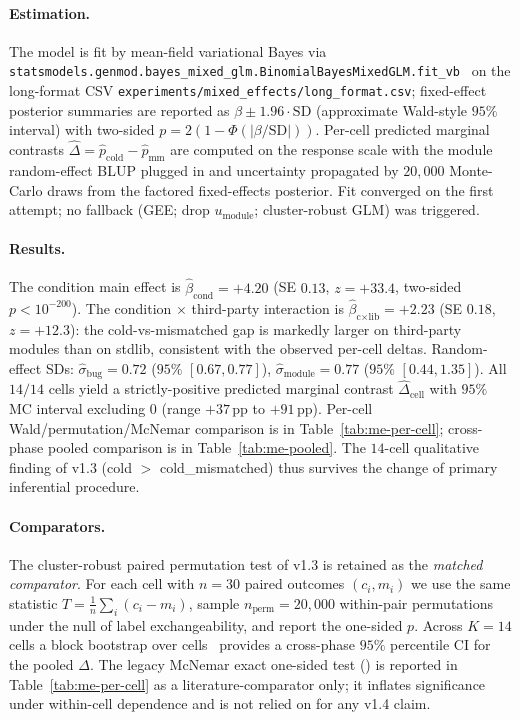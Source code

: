 \paragraph{Estimation.} The model is fit by mean-field variational Bayes via \texttt{statsmodels.\allowbreak genmod.\allowbreak bayes\_mixed\_glm.\allowbreak BinomialBayesMixedGLM.fit\_vb}~\cite{seabold2010statsmodels} on the long-format CSV \texttt{experiments/mixed\_effects/long\_format.csv}; fixed-effect posterior summaries are reported as $\beta \pm 1.96 \cdot \mathrm{SD}$ (approximate Wald-style $95\%$ interval) with two-sided $p = 2(1 - \Phi(|\beta/\mathrm{SD}|))$. Per-cell predicted marginal contrasts $\widehat{\Delta} = \widehat{p}_{\text{cold}} - \widehat{p}_{\text{mm}}$ are computed on the response scale with the module random-effect BLUP plugged in and uncertainty propagated by $20{,}000$ Monte-Carlo draws from the factored fixed-effects posterior. Fit converged on the first attempt; no fallback (GEE; drop $u_{\text{module}}$; cluster-robust GLM) was triggered.

\paragraph{Results.}
The condition main effect is $\widehat{\beta}_{\text{cond}} = +4.20$ (SE $0.13$, $z=+33.4$, two-sided $p < 10^{-200}$). The condition $\times$ third-party interaction is $\widehat{\beta}_{\text{c$\times$lib}} = +2.23$ (SE $0.18$, $z=+12.3$): the cold-vs-mismatched gap is markedly larger on third-party modules than on stdlib, consistent with the observed per-cell deltas. Random-effect SDs: $\widehat{\sigma}_{\text{bug}} = 0.72$ ($95\%$ $[0.67, 0.77]$), $\widehat{\sigma}_{\text{module}} = 0.77$ ($95\%$ $[0.44, 1.35]$). All $14/14$ cells yield a strictly-positive predicted marginal contrast $\widehat{\Delta}_{\text{cell}}$ with $95\%$ MC interval excluding $0$ (range $+37\,\text{pp}$ to $+91\,\text{pp}$). Per-cell Wald/permutation/McNemar comparison is in Table~\ref{tab:me-per-cell}; cross-phase pooled comparison is in Table~\ref{tab:me-pooled}. The $14$-cell qualitative finding of v1.3 (cold $>$ cold\_mismatched) thus survives the change of primary inferential procedure.

\paragraph{Comparators.}
The cluster-robust paired permutation test of v1.3 is retained as the \emph{matched comparator}. For each cell with $n = 30$ paired outcomes $(c_i, m_i)$ we use the same statistic $T = \tfrac{1}{n}\sum_i(c_i - m_i)$, sample $n_{\text{perm}} = 20{,}000$ within-pair permutations under the null of label exchangeability, and report the one-sided $p$. Across $K = 14$ cells a block bootstrap over cells~\cite{efron1994bootstrap} provides a cross-phase $95\%$ percentile CI for the pooled $\Delta$. The legacy McNemar exact one-sided test () is reported in Table~\ref{tab:me-per-cell} as a literature-comparator only; it inflates significance under within-cell dependence and is not relied on for any v1.4 claim.

